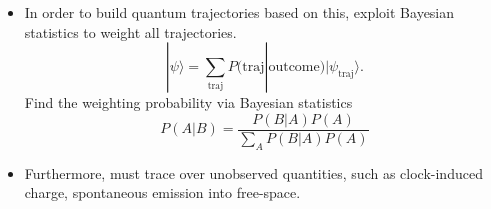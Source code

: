 \begin{itemize}
  \item In order to build quantum trajectories based on this, exploit Bayesian statistics
    to weight all trajectories.  
    \begin{equation}
      |\psi\rangle = \sum_{\text{traj}} P(\text{traj}|\text{outcome})|\psi_{\text{traj}}\rangle.
    \end{equation}
    Find the weighting probability via Bayesian statistics
    \begin{equation}
      P(A|B) = \frac{P(B|A)P(A)}{\sum_AP(B|A)P(A)}
    \end{equation}
  \item Furthermore, must trace over unobserved quantities, such as clock-induced 
    charge, spontaneous emission into free-space.  
\end{itemize}



